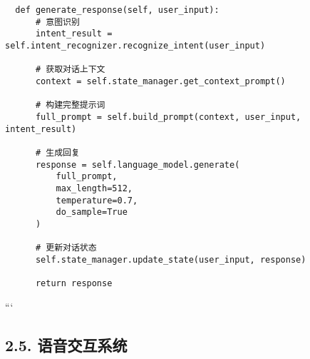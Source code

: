 \begin{itemize}
\begin{lstlisting}
  def generate_response(self, user_input):
      # 意图识别
      intent_result = self.intent_recognizer.recognize_intent(user_input)

      # 获取对话上下文
      context = self.state_manager.get_context_prompt()

      # 构建完整提示词
      full_prompt = self.build_prompt(context, user_input, intent_result)

      # 生成回复
      response = self.language_model.generate(
          full_prompt,
          max_length=512,
          temperature=0.7,
          do_sample=True
      )

      # 更新对话状态
      self.state_manager.update_state(user_input, response)

      return response
\end{lstlisting}

  ```
\end{itemize}

\subsection{2.5.
语音交互系统}\label{ux8bedux97f3ux4ea4ux4e92ux7cfbux7edf}

